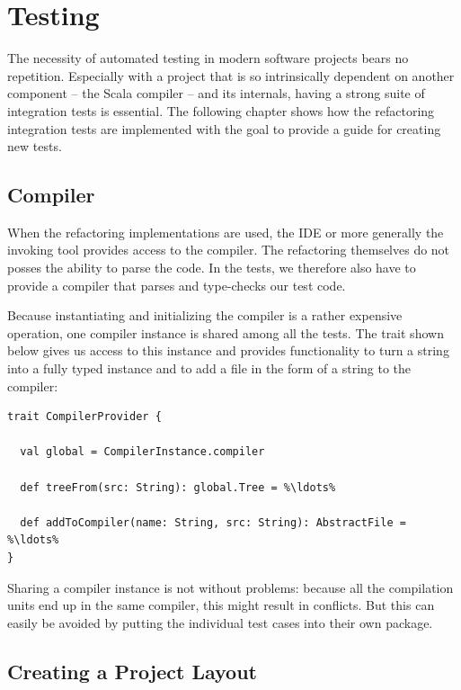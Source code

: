 \documentclass[10pt,a4paper,oneside]{scrreprt}
\begin{document}
\chapter{Testing} \label{chapter:testing}

The necessity of automated testing in modern software projects bears no repetition. Especially with a project that is so intrinsically dependent on another component -- the Scala compiler -- and its internals, having a strong suite of integration tests is essential. The following chapter shows how the refactoring integration tests are implemented with the goal to provide a guide for creating new tests.

\section{Compiler}

When the refactoring implementations are used, the IDE or more generally the invoking tool provides access to the compiler. The refactoring themselves do not posses the ability to parse the code. In the tests, we therefore also have to provide a compiler that parses and type-checks our test code.

Because instantiating and initializing the compiler is a rather expensive operation, one compiler instance is shared among all the tests. The  trait shown below gives us access to this instance and provides functionality to turn a string into a fully typed  instance and to add a file in the form of a string to the compiler:

\begin{lstlisting}
trait CompilerProvider {

  val global = CompilerInstance.compiler
    
  def treeFrom(src: String): global.Tree = %\ldots%
  
  def addToCompiler(name: String, src: String): AbstractFile = %\ldots%
}
\end{lstlisting}

Sharing a compiler instance is not without problems: because all the compilation units end up in the same compiler, this might result in conflicts. But this can easily be avoided by putting the individual test cases into their own package.

\section{Creating a Project Layout}
\end{document}
